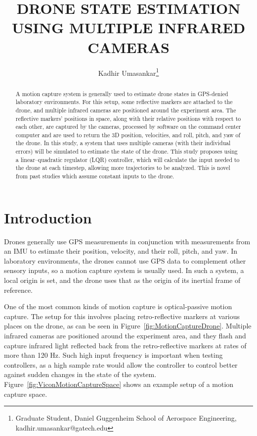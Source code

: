 \documentclass[letterpaper, paper,11pt]{AAS}	%
\begin{document}
\title{DRONE STATE ESTIMATION USING MULTIPLE INFRARED CAMERAS}

\author{Kadhir Umasankar\thanks{Graduate Student, Daniel Guggenheim School of Aerospace Engineering, kadhir.umasankar@gatech.edu}}


\maketitle{} 		


\begin{abstract}
A motion capture system is generally used to estimate drone states in GPS-denied laboratory environments. For this setup, some reflective markers are attached to the drone, and multiple infrared cameras are positioned around the experiment area. The reflective markers' positions in space, along with their relative positions with respect to each other, are captured by the cameras, processed by software on the command center computer and are used to return the 3D position, velocities, and roll, pitch, and yaw of the drone. In this study, a system that uses multiple cameras (with their individual errors) will be simulated to estimate the state of the drone. This study proposes using a linear–quadratic regulator (LQR) controller, which will calculate the input needed to the drone at each timestep, allowing more trajectories to be analyzed. This is novel from past studies which assume constant inputs to the drone.
\end{abstract}


\section{Introduction}
Drones generally use GPS measurements in conjunction with measurements from an IMU to estimate their position, velocity, and their roll, pitch, and yaw. In laboratory environments, the drones cannot use GPS data to complement other sensory inputs, so a motion capture system is usually used\cite{vicon_2022}. In such a system, a local origin is set, and the drone uses that as the origin of its inertial frame of reference.

One of the most common kinds of motion capture is optical-passive motion capture. The setup for this involves placing retro-reflective markers at various places on the drone, as can be seen in Figure~\ref{fig:MotionCaptureDrone}. Multiple infrared cameras are positioned around the experiment area, and they flash and capture infrared light reflected back from the retro-reflective markers at rates of more than 120 Hz. Such high input frequency is important when testing controllers, as a high sample rate would allow the controller to control better against sudden changes in the state of the system. Figure~\ref{fig:ViconMotionCaptureSpace} shows an example setup of a motion capture space.
\end{document}
